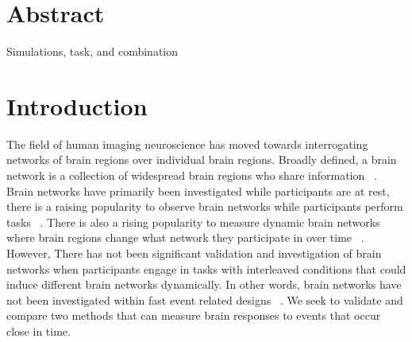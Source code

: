 \documentclass[10pt,letterpaper]{article}
\begin{document}
\section*{Abstract}
Simulations, task, and combination


\linenumbers

\section*{Introduction}

The field of human imaging neuroscience has moved towards interrogating networks of brain regions
over individual brain regions.
Broadly defined, a brain network is a collection of widespread brain regions who share information ~\cite{Uddin2019}.
Brain networks have primarily been investigated while participants are at rest, there
is a raising popularity to observe brain networks while participants perform tasks ~\cite{Cole2014a}.
There is also a rising popularity to measure dynamic brain networks where brain regions change
what network they participate in over time ~\cite{Sakoglu2008,Hindriks2016}.
However, There has not been significant validation and investigation of brain networks
when participants engage in tasks with interleaved conditions that could induce
different brain networks dynamically.
In other words, brain networks have not been investigated within fast event related designs ~\cite{Buckner1998}.
We seek to validate and compare two methods that can measure brain responses to events that occur
close in time.
\end{document}
